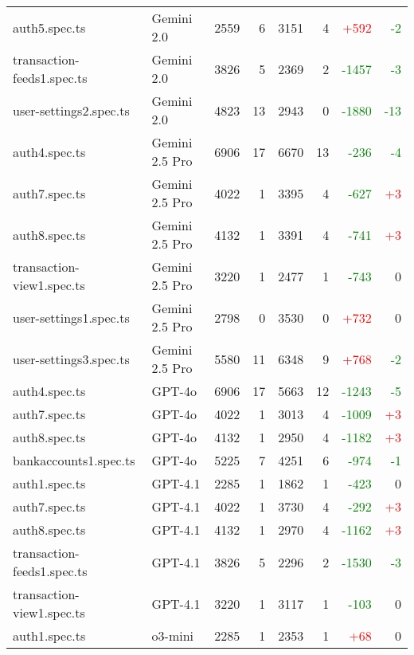 \begin{table}[htbp]
\begin{tabular}{|p{3cm}|p{2cm}|r|r|r|r|r|r|}
auth5.spec.ts & Gemini 2.0 & 2559 & 6 & 3151 & 4 & \textcolor{red}{+592} & \textcolor{green}{-2} \\
transaction-feeds1.spec.ts & Gemini 2.0 & 3826 & 5 & 2369 & 2 & \textcolor{green}{-1457} & \textcolor{green}{-3} \\
user-settings2.spec.ts & Gemini 2.0 & 4823 & 13 & 2943 & 0 & \textcolor{green}{-1880} & \textcolor{green}{-13} \\
\hline
auth4.spec.ts & Gemini 2.5 Pro & 6906 & 17 & 6670 & 13 & \textcolor{green}{-236} & \textcolor{green}{-4} \\
auth7.spec.ts & Gemini 2.5 Pro & 4022 & 1 & 3395 & 4 & \textcolor{green}{-627} & \textcolor{red}{+3} \\
auth8.spec.ts & Gemini 2.5 Pro & 4132 & 1 & 3391 & 4 & \textcolor{green}{-741} & \textcolor{red}{+3} \\
transaction-view1.spec.ts & Gemini 2.5 Pro & 3220 & 1 & 2477 & 1 & \textcolor{green}{-743} & 0 \\
user-settings1.spec.ts & Gemini 2.5 Pro & 2798 & 0 & 3530 & 0 & \textcolor{red}{+732} & 0 \\
user-settings3.spec.ts & Gemini 2.5 Pro & 5580 & 11 & 6348 & 9 & \textcolor{red}{+768} & \textcolor{green}{-2} \\
\hline
auth4.spec.ts & GPT-4o & 6906 & 17 & 5663 & 12 & \textcolor{green}{-1243} & \textcolor{green}{-5} \\
auth7.spec.ts & GPT-4o & 4022 & 1 & 3013 & 4 & \textcolor{green}{-1009} & \textcolor{red}{+3} \\
auth8.spec.ts & GPT-4o & 4132 & 1 & 2950 & 4 & \textcolor{green}{-1182} & \textcolor{red}{+3} \\
bankaccounts1.spec.ts & GPT-4o & 5225 & 7 & 4251 & 6 & \textcolor{green}{-974} & \textcolor{green}{-1} \\
\hline
auth1.spec.ts & GPT-4.1 & 2285 & 1 & 1862 & 1 & \textcolor{green}{-423} & 0 \\
auth7.spec.ts & GPT-4.1 & 4022 & 1 & 3730 & 4 & \textcolor{green}{-292} & \textcolor{red}{+3} \\
auth8.spec.ts & GPT-4.1 & 4132 & 1 & 2970 & 4 & \textcolor{green}{-1162} & \textcolor{red}{+3} \\
transaction-feeds1.spec.ts & GPT-4.1 & 3826 & 5 & 2296 & 2 & \textcolor{green}{-1530} & \textcolor{green}{-3} \\
transaction-view1.spec.ts & GPT-4.1 & 3220 & 1 & 3117 & 1 & \textcolor{green}{-103} & 0 \\
\hline
auth1.spec.ts & o3-mini & 2285 & 1 & 2353 & 1 & \textcolor{red}{+68} & 0 \\

\end{tabular}
\end{table}
